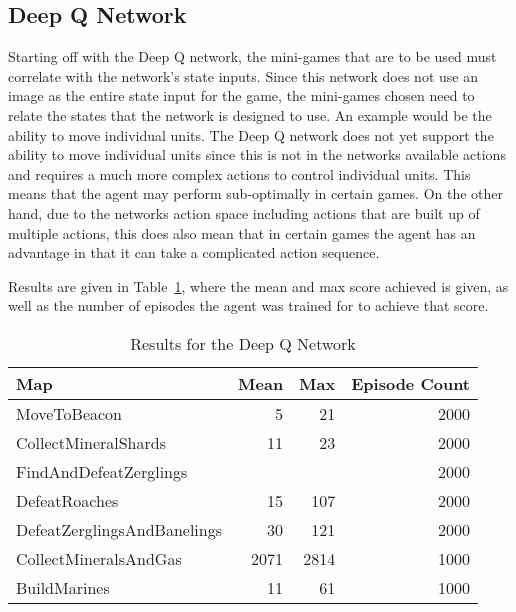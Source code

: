 \subsection{Deep Q Network}

Starting off with the Deep Q network, the mini-games that are to be used must
correlate with the network's state inputs. Since this network does not use an
image as the entire state input for the game, the mini-games chosen need to
relate the states that the network is designed to use. An example would be the
ability to move individual units. The Deep Q network does not yet support the
ability to move individual units since this is not in the networks available actions and
requires a much more complex actions to control individual units. This means
that the agent may perform sub-optimally in certain games.
On the other hand, due to the networks action space including actions that are
built up of multiple actions, this does also mean that in certain games the
agent has an advantage in that it can take a complicated action sequence.

Results are given in Table~\ref{tab:dqn_results}, where the mean and max score
achieved is given, as well as the number of episodes the agent was trained for
to achieve that score.

\begin{table}[h]
    \centering
    \begin{tabular}{@{}lrrr@{}}
        \toprule
        Map                         & Mean & Max & Episode Count \\ \midrule
        MoveToBeacon                & 5    & 21  & 2000          \\
        CollectMineralShards        & 11   & 23  & 2000          \\
        FindAndDefeatZerglings      &      &     & 2000              \\
        DefeatRoaches               & 15   & 107 & 2000              \\
        DefeatZerglingsAndBanelings & 30   & 121 & 2000              \\
        CollectMineralsAndGas       & 2071 & 2814& 1000          \\
        BuildMarines                & 11   & 61  & 1000          \\ \bottomrule
    \end{tabular}
    \caption{Results for the Deep Q Network}%
    \label{tab:dqn_results}%
\end{table}

